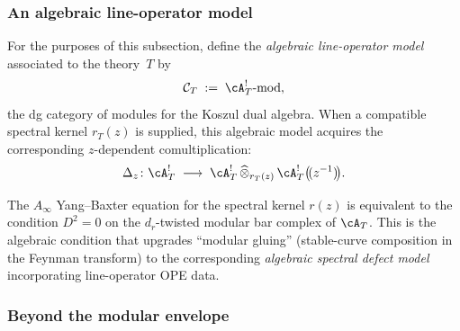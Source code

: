 \subsubsection{An algebraic line-operator model}

\begin{definition}
\label{def:line-operator-category-yb}
For the purposes of this subsection, define the
\emph{algebraic line-operator model} associated to the theory~$T$ by
\begin{equation}\label{eq:line-cat}
 \mathcal{C}_T
 \;:=\;
 \cA_T^!\text{-}\mathrm{mod},
\end{equation}
the dg category of modules for the Koszul dual algebra. When a
compatible spectral kernel $r_T(z)$ is supplied, this algebraic model
acquires the corresponding $z$-dependent comultiplication:
\begin{equation}\label{eq:twisted-coproduct}
 \Delta_z \colon
 \cA_T^!
 \;\longrightarrow\;
 \cA_T^! \,\widehat{\otimes}_{r_T(z)}\,
 \cA_T^!\bigl(\!(z^{-1})\!\bigr).
\end{equation}
\end{definition}

\begin{conjecture}[Consistency via $D^2 = 0$; \ClaimStatusConjectured]
\label{conj:ainfty-yb-consistency}%
The $A_\infty$ Yang--Baxter equation for the spectral kernel $r(z)$
is equivalent to the condition $D^2 = 0$ on the $d_r$-twisted
modular bar complex of $\cA_T$. This is the algebraic
condition that upgrades ``modular gluing'' (stable-curve composition
in the Feynman transform) to the corresponding \emph{algebraic
spectral defect model} incorporating line-operator OPE data.
\end{conjecture}

\subsubsection{Beyond the modular envelope}

